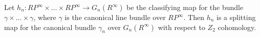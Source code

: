 Let $h_n: RP^\infty \times \dots \times RP^\infty \rightarrow G_n(R^\infty)$ be the classifying map for the bundle $\gamma \times \dots \times \gamma$, where $\gamma$ is the canonical line bundle over $RP^\infty$. Then $h_n$ is a splitting map for the canonical bundle $\gamma_n$ over $G_n(R^\infty)$ with respect to $Z_2$ cohomology.
